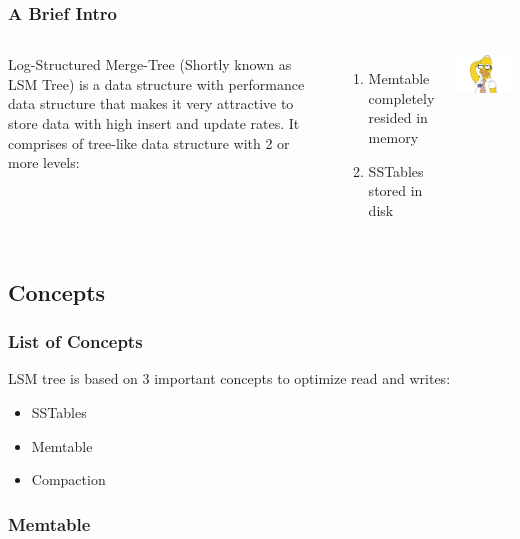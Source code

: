 \documentclass[
	11pt, 
]{beamer}
\begin{document}
\begin{frame}
    \frametitle{A Brief Intro}
    \begin{columns} 
            Log-Structured Merge-Tree (Shortly known as LSM Tree) is a data structure with performance data structure that makes it very attractive to store data with high insert and update rates. \newline \newline
            It comprises of tree-like data structure with 2 or more levels: 
            \begin{enumerate}
                \item Memtable completely resided in memory
                \item SSTables stored in disk
            \end{enumerate}
            \includegraphics[scale=0.5]{What.png}
    \end{columns}
\end{frame}

\subsection{Concepts}

\begin{frame}
    \frametitle{List of Concepts}
    LSM tree is based on 3 important concepts to optimize read and writes: \newline
    \begin{itemize}
        \item SSTables
        \item Memtable
        \item Compaction
    \end{itemize}
    
\end{frame}

\subsubsection{Memtable}
\end{document}
